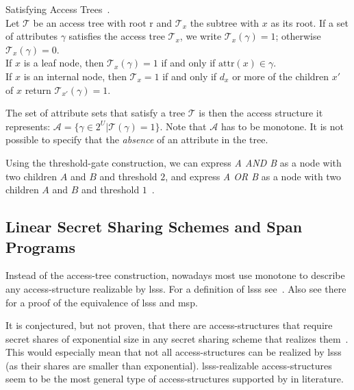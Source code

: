 \begin{definition}
    Satisfying Access Trees~\cite{goyal_attribute-based_2006}.\\
    Let $\mathcal{T}$ be an access tree with root r and $\mathcal{T}_x$ the subtree with $x$ as its root.
    If a set of attributes $\gamma$ satisfies the access tree $\mathcal{T}_x$, we write $\mathcal{T}_x(\gamma) = 1$; otherwise $\mathcal{T}_x(\gamma) = 0$.\\
    If $x$ is a leaf node, then $\mathcal{T}_x(\gamma) = 1$ if and only if $\text{attr}(x) \in \gamma$.\\
    If $x$ is an internal node, then $\mathcal{T}_x = 1$ if and only if $d_x$ or more of the children $x'$ of $x$ return $\mathcal{T}_{x'}(\gamma) = 1$.
\end{definition}
The set of attribute sets that satisfy a tree $\mathcal{T}$ is then the access structure it represents: $\mathcal{A} = \{\gamma \in 2^U | \mathcal{T}(\gamma) = 1\}$.
Note that $\mathcal{A}$ has to be monotone. It is not possible to specify that the \emph{absence} of an attribute in the tree.

Using the threshold-gate construction, we can express \emph{A AND B} as a node with two children $A$ and $B$ and threshold $2$, and express \emph{A OR B} as a node with two children $A$ and $B$ and threshold $1$~\cite{yao_lightweight_2015}.

\subsection{Linear Secret Sharing Schemes and Span Programs}\label{sec:lsss} %
Instead of the \gls{access-tree} construction, nowadays most  use monotone  to describe any \gls{access-structure} realizable by \acrfull{lsss}.
For a definition of \acrshort{lsss} see~\cite{beimel_secure_1996}.
Also see there for a proof of the equivalence of \acrshort{lsss} and \acrshort{msp}.

It is conjectured, but not proven, that there are \glspl{access-structure} that require secret shares of exponential size in any secret sharing scheme that realizes them~\cite{beimel_secure_1996}.
This would especially mean that not all \glspl{access-structure} can be realized by \acrshort{lsss} (as their shares are smaller than exponential).
\acrshort{lsss}-realizable \glspl{access-structure} seem to be the most general type of \glspl{access-structure} supported by  in literature. 

